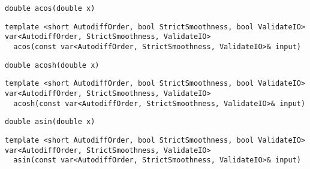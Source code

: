 \begin{tcolorbox}[colback=white,colframe=gray90, coltitle=black,boxrule=3pt,
fonttitle=\bfseries,title= Acos]

\begin{verbatim}
double acos(double x)

\end{verbatim}

\begin{verbatim}
template <short AutodiffOrder, bool StrictSmoothness, bool ValidateIO>
var<AutodiffOrder, StrictSmoothness, ValidateIO>
  acos(const var<AutodiffOrder, StrictSmoothness, ValidateIO>& input)

\end{verbatim}

\end{tcolorbox}

\begin{tcolorbox}[colback=white,colframe=gray90, coltitle=black,boxrule=3pt,
fonttitle=\bfseries,title= Acosh]

\begin{verbatim}
double acosh(double x)

\end{verbatim}

\begin{verbatim}
template <short AutodiffOrder, bool StrictSmoothness, bool ValidateIO>
var<AutodiffOrder, StrictSmoothness, ValidateIO>
  acosh(const var<AutodiffOrder, StrictSmoothness, ValidateIO>& input)

\end{verbatim}

\end{tcolorbox}

\begin{tcolorbox}[colback=white,colframe=gray90, coltitle=black,boxrule=3pt,
fonttitle=\bfseries,title= Asin]

\begin{verbatim}
double asin(double x)

\end{verbatim}

\begin{verbatim}
template <short AutodiffOrder, bool StrictSmoothness, bool ValidateIO>
var<AutodiffOrder, StrictSmoothness, ValidateIO>
  asin(const var<AutodiffOrder, StrictSmoothness, ValidateIO>& input)

\end{verbatim}

\end{tcolorbox}

